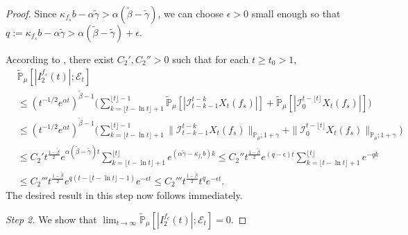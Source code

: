 \documentclass[12pt,a4paper]{amsart}
\theoremstyle{plain}
\theoremstyle{definition}
\numberwithin{equation}{section}
\begin{document}
\begin{proof}
  Since $\kappa_{f_s} b -\alpha \tilde \gamma > \alpha (\tilde \beta - \tilde \gamma)$, we can choose $\epsilon >0$ small enough so that $q:=\kappa_{f_s}b- \alpha \tilde \gamma  > \alpha (\tilde \beta - \tilde \gamma) + \epsilon $.

	According to \cite[Lemma 2.13]{RenSongSunZhao2019Stable}, there exist $C_2',C_2''>0$ such that for each $t\geq t_0 >1$,
  \begin{align}
    & \mathbb{\widetilde{P}}_{\mu} [ |I^{f_s}_2(t)|;\mathcal{E}_t] \\
    & \leq  ( t^{-1/2}e^{\alpha t} )^{\tilde \beta - 1}\Big(\sum_{k=\lfloor t-\ln t \rfloor+1}^{\lfloor t \rfloor - 1}\mathbb{\widetilde{P}}_{\mu} [| \mathcal{I}_{t-k-1}^{t-k} X_t(f_s) |] + \mathbb{\widetilde{P}}_{\mu}[| \mathcal{I}_{0}^{t-\lfloor t\rfloor} X_t(f_s)|]\Big) \\
    & \leq  ( t^{-1/2}e^{\alpha t} )^{\tilde \beta - 1}\Big(\sum_{k=\lfloor t-\ln t \rfloor+1}^{\lfloor t \rfloor - 1}\|\mathcal{I}_{t-k-1}^{t-k} X_t(f_s) \|_{\mathbb P_\mu; 1+\gamma} + \|\mathcal I_0^{t-\lfloor t \rfloor} X_t(f_s)\|_{\mathbb P_\mu;1+\gamma}\Big) \\
    & \leq C_2't^{\frac{1-\tilde{\beta}}{2}} e^{\alpha (\tilde \beta - \tilde \gamma)t}\sum_{k=\lfloor t-\ln t \rfloor+1}^{\lfloor t \rfloor}  e^{(\alpha\tilde \gamma-\kappa_{f_s} b)k}
      \leq C_2''t^{\frac{1-\tilde{\beta}}{2}} e^{(q-\epsilon) t}\sum_{k=\lfloor t-\ln t \rfloor+1}^{\lfloor t \rfloor}  e^{-q k}
    \\ & \leq C_2'''t^{\frac{1-\tilde{\beta}}{2}} e^{q(t - \lfloor t - \ln t\rfloor-1)}e^{-\epsilon t}
         \leq C_2'''t^{\frac{1-\tilde{\beta}}{2}} t^q e^{- \epsilon t}.
  \end{align}
The desired result in this step now follows immediately.

\emph{Step 2.} We show that $\lim_{t\rightarrow \infty}\widetilde{\mathbb P}_{\mu}[|I^{f_c}_2(t)|;\mathcal{E}_t]=0$.


\end{proof}
\end{document}
